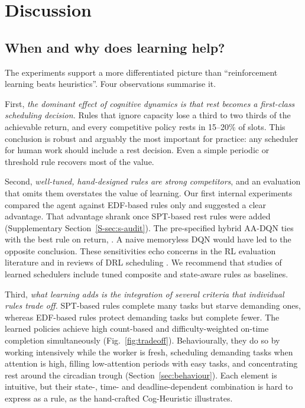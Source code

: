 \section{Discussion}\label{sec:discussion}

\subsection{When and why does learning help?}
The experiments support a more differentiated picture than ``reinforcement learning beats heuristics''. Four observations summarise it.

First, \emph{the dominant effect of cognitive dynamics is that rest becomes a first-class scheduling decision.} Rules that ignore capacity lose a third to two thirds of the achievable return, and every competitive policy rests in 15--20\% of slots. This conclusion is robust and arguably the most important for practice: any scheduler for human work should include a rest decision. Even a simple periodic or threshold rule recovers most of the value.

Second, \emph{well-tuned, hand-designed rules are strong competitors}, and an evaluation that omits them overstates the value of learning. Our first internal experiments compared the agent against EDF-based rules only and suggested a clear advantage. That advantage shrank once SPT-based rest rules were added (Supplementary Section~\ref{S-sec:s-audit}). The pre-specified hybrid AA-DQN ties with the best rule on return, . A naive memoryless DQN would have led to the opposite conclusion.  These sensitivities echo concerns in the RL evaluation literature \cite{henderson2018,agarwal2021} and in reviews of DRL scheduling \cite{kayhan2023,khadivi2025}. We recommend that studies of learned schedulers include tuned composite and state-aware rules as baselines.

Third, \emph{what learning adds is the integration of several criteria that individual rules trade off.} SPT-based rules complete many tasks but starve demanding ones, whereas EDF-based rules protect demanding tasks but complete fewer. The learned policies achieve high count-based and difficulty-weighted on-time completion simultaneously (Fig.~\ref{fig:tradeoff}). Behaviourally, they do so by working intensively while the worker is fresh, scheduling demanding tasks when attention is high, filling low-attention periods with easy tasks, and concentrating rest around the circadian trough (Section~\ref{sec:behaviour}). Each element is intuitive, but their state-, time- and deadline-dependent combination is hard to express as a rule, as the hand-crafted Cog-Heuristic illustrates.

